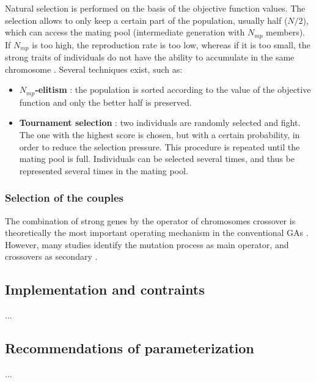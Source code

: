 \documentclass{ametsoc}
\begin{document}
Natural selection is performed on the basis of the objective function values. The selection allows to only keep a certain part of the population, usually half ($N/2$), which can access the mating pool (intermediate generation with $N_{mp}$ members). If $N_{mp}$ is too high, the reproduction rate is too low, whereas if it is too small, the strong traits of individuals do not have the ability to accumulate in the same chromosome \citep{Haupt2004}. Several techniques exist, such as:

\begin{itemize}
	\item \textbf{$N_{mp}$-elitism} \citep{Michalewicz1996}: the population is sorted according to the value of the objective function and only the better half is preserved. 
		
	\item \textbf{Tournament selection} \citep{Michalewicz1996, Zitzler2004a}: two individuals are randomly selected and fight. The one with the highest score is chosen, but with a certain probability, in order to reduce the selection pressure. This procedure is repeated until the mating pool is full. Individuals can be selected several times, and thus be represented several times in the mating pool.
\end{itemize}


\subsubsection{Selection of the couples}










The combination of strong genes by the operator of chromosomes crossover is theoretically the most important operating mechanism in the conventional GAs \citep{Holland1992b,Back1993b}. However, many studies identify the mutation process as main operator, and crossovers as secondary \citep[see][]{Back1992a,Back1996a,Back1996b,Smith1997a,Deb1999,Haupt2004,Costa2005a,Costa2007a}.





\subsection{Implementation and contraints}
...

\subsection{Recommendations of parameterization}
...
\end{document}
